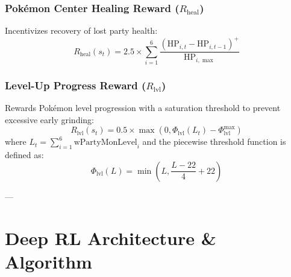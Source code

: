 \documentclass[conference]{IEEEtran}
\begin{document}
\subsubsection{Pok{\'e}mon Center Healing Reward \texorpdfstring{($R_{\text{heal}}$)}{(R\_heal)}}
Incentivizes recovery of lost party health:
\begin{equation}
R_{\text{heal}}(s_t) = 2.5 \times \sum_{i=1}^6 \frac{(\text{HP}_{i,t} - \text{HP}_{i,t-1})^+}{\text{HP}_{i,\max}}
\end{equation}

\subsubsection{Level-Up Progress Reward \texorpdfstring{($R_{\text{lvl}}$)}{(R\_lvl)}}
Rewards Pokémon level progression with a saturation threshold to prevent excessive early grinding:
\begin{equation}
R_{\text{lvl}}(s_t) = 0.5 \times \max\left(0, \Phi_{\text{lvl}}(L_t) - \Phi_{\text{lvl}}^{\max}\right)
\end{equation}
where $L_t = \sum_{i=1}^6 \text{wPartyMonLevel}_i$ and the piecewise threshold function is defined as:
\begin{equation}
\Phi_{\text{lvl}}(L) = \min\left( L, \frac{L - 22}{4} + 22 \right)
\end{equation}

---

\section{Deep RL Architecture \& Algorithm}
\end{document}

